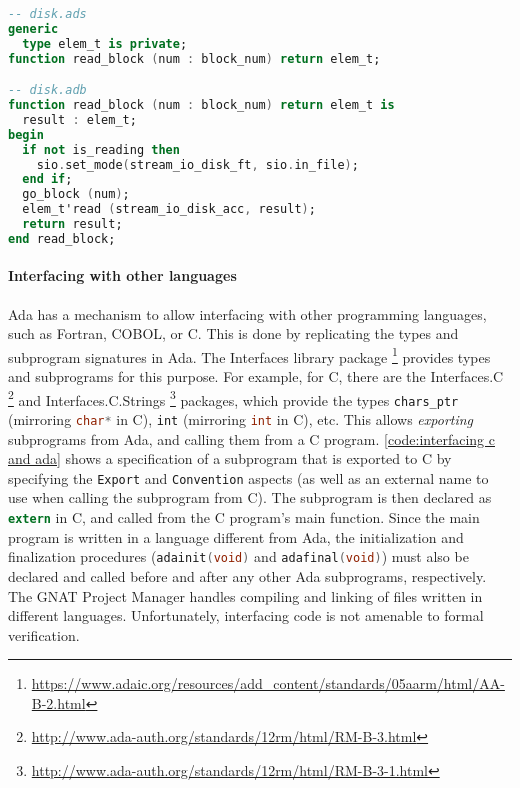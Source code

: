 \begin{lstlisting}[caption={Generic function for reading a block of type \textnormal{elem\_t}}, label={code:generic reading function}, language=Ada]
-- disk.ads
generic
  type elem_t is private;
function read_block (num : block_num) return elem_t;

-- disk.adb
function read_block (num : block_num) return elem_t is
  result : elem_t;
begin
  if not is_reading then
    sio.set_mode(stream_io_disk_ft, sio.in_file);
  end if;
  go_block (num);
  elem_t'read (stream_io_disk_acc, result);
  return result;
end read_block;
\end{lstlisting}

\paragraph{Interfacing with other languages}
Ada has a mechanism to allow interfacing with other programming languages, such as Fortran, COBOL, or C.
This is done by replicating the types and subprogram signatures in Ada.
The Interfaces library package \footnote{\url{https://www.adaic.org/resources/add_content/standards/05aarm/html/AA-B-2.html}} provides types and subprograms for this purpose.
For example, for C, there are the Interfaces.C \footnote{\url{http://www.ada-auth.org/standards/12rm/html/RM-B-3.html}} and Interfaces.C.Strings \footnote{\url{http://www.ada-auth.org/standards/12rm/html/RM-B-3-1.html}} packages, which provide the types \lstinline[language=Ada]{chars_ptr} (mirroring \lstinline[language=C]{char*} in C), \lstinline[language=Ada]{int} (mirroring \lstinline[language=C]{int} in C), etc.
This allows \textit{exporting} subprograms from Ada, and calling them from a C program.
\autoref{code:interfacing c and ada} shows a specification of a subprogram that is exported to C by specifying the \lstinline[language=Ada]{Export} and \lstinline[language=Ada]{Convention} aspects (as well as an external name to use when calling the subprogram from C).
The subprogram is then declared as \lstinline[language=C]{extern} in C, and called from the C program's main function.
Since the main program is written in a language different from Ada, the initialization and finalization procedures (\lstinline[language=C]{adainit(void)} and \lstinline[language=C]{adafinal(void)}) must also be declared and called before and after any other Ada subprograms, respectively.
The GNAT Project Manager handles compiling and linking of files written in different languages.
Unfortunately, interfacing code is not amenable to formal verification.

